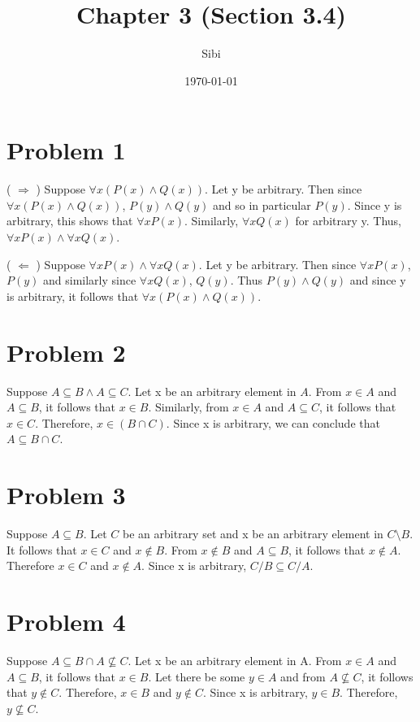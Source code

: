 \documentclass{article}
\begin{document}
\title{Chapter 3 (Section 3.4)}
\author{Sibi}
\date{\today}
\maketitle
\newpage

\section{Problem 1}

( $\Rightarrow$ ) Suppose $\forall x ( P(x) \land Q(x))$. Let y be
arbitrary. Then since $\forall x (P(x) \land Q(x))$, $P(y) \land Q(y)$
and so in particular $P(y)$. Since y is arbitrary, this shows that
$\forall x P(x)$. Similarly, $\forall x Q(x)$ for arbitrary y. Thus,
$\forall x P(x) \land \forall x Q(x)$.

( $\Leftarrow$ ) Suppose $\forall x P(x) \land \forall x Q(x)$. Let y
be arbitrary. Then since $\forall x P(x)$, $P(y)$ and similarly since
$\forall x Q(x)$, $Q(y)$. Thus $P(y) \land Q(y)$ and since y is
arbitrary, it follows that $\forall x(P(x) \land Q(x))$.

\section{Problem 2}

Suppose $A \subseteq B \land A \subseteq C$. Let x be an arbitrary
element in $A$. From $x \in A$ and $A \subseteq B$, it follows that $x
\in B$. Similarly, from $x \in A$ and $A \subseteq C$, it follows that
$x \in C$. Therefore, $x \in (B \cap C)$. Since x is arbitrary, we can
conclude that $A \subseteq B \cap C$.

\section{Problem 3}

Suppose $A \subseteq B$. Let $C$ be an arbitrary set and x be an
arbitrary element in $C \setminus B$. It follows that $x \in C$ and $x
\notin B$. From $x \notin B$ and $A \subseteq B$, it follows that $x
\notin A$. Therefore $x \in C$ and $x \notin A$. Since x is arbitrary,
$C/B \subseteq C/A$.

\section{Problem 4}

Suppose $A \subseteq B \cap A \nsubseteq C$. Let x be an arbitrary
element in A. From $x \in A$ and $A \subseteq B$, it follows that $x
\in B$. Let there be some $y \in A$ and from $A \nsubseteq C$, it
follows that $y \notin C$. Therefore, $x \in B$ and $y \notin C$.
Since x is arbitrary, $y \in B$. Therefore, $y \nsubseteq C$.
\end{document}
